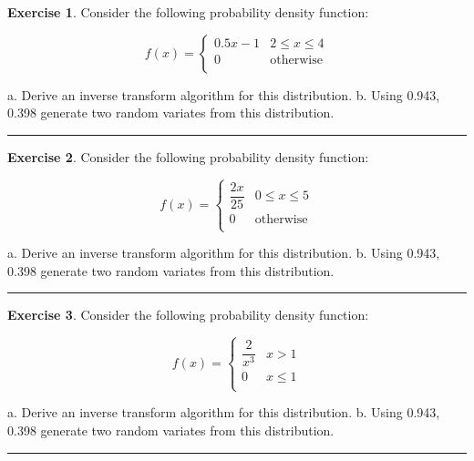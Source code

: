 \documentclass[
]{book}
\theoremstyle{definition}
\theoremstyle{definition}
\theoremstyle{definition}
\newtheorem{exercise}{Exercise}[chapter]
\theoremstyle{definition}
\theoremstyle{remark}
\begin{document}
\begin{exercise}
\protect\hypertarget{exr:AppRNRVP19}{}{\label{exr:AppRNRVP19} }Consider the following probability density function:

\[f(x) = 
  \begin{cases}
     0.5x - 1 & 2 \leq x \leq 4\\
     0 & \text{otherwise} \\
  \end{cases}\]
\end{exercise}
a. Derive an inverse transform algorithm for this distribution.
b. Using 0.943, 0.398 generate two random variates from this distribution.

\begin{center}\rule{0.5\linewidth}{0.5pt}\end{center}

\begin{exercise}
\protect\hypertarget{exr:AppRNRVP20}{}{\label{exr:AppRNRVP20} }Consider the following probability density function:

\[f(x) = 
  \begin{cases}
     \dfrac{2x}{25} & 0 \leq x \leq 5\\
     0 & \text{otherwise} \\
  \end{cases}\]
\end{exercise}
a. Derive an inverse transform algorithm for this distribution.
b. Using 0.943, 0.398 generate two random variates from this distribution.

\begin{center}\rule{0.5\linewidth}{0.5pt}\end{center}

\begin{exercise}
\protect\hypertarget{exr:AppRNRVP21}{}{\label{exr:AppRNRVP21} }Consider the following probability density function:

\[f(x) = 
  \begin{cases}
     \dfrac{2}{x^3} & x > 1\\
     0 & x \leq 1\\
  \end{cases}\]
\end{exercise}
a. Derive an inverse transform algorithm for this distribution.
b. Using 0.943, 0.398 generate two random variates from this distribution.

\begin{center}\rule{0.5\linewidth}{0.5pt}\end{center}
\end{document}
